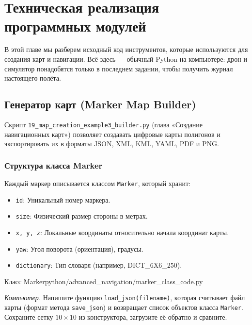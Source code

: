 \section{Техническая реализация программных модулей}
\label{sec:python-tools}

В этой главе мы разберем исходный код инструментов, которые используются для создания карт и навигации. Всё здесь --- обычный Python на компьютере: дрон и симулятор понадобятся только в последнем задании, чтобы получить журнал настоящего полёта.

\subsection{Генератор карт (Marker Map Builder)}
Скрипт \texttt{19\_map\_creation\_example3\_builder.py} (глава «Создание навигационных карт») позволяет создавать цифровые карты полигонов и экспортировать их в форматы JSON, XML, KML, YAML, PDF и PNG.

\subsubsection{Структура класса Marker}
Каждый маркер описывается классом \texttt{Marker}, который хранит:
\begin{itemize}
    \item \texttt{id}: Уникальный номер маркера.
    \item \texttt{size}: Физический размер стороны в метрах.
    \item \texttt{x, y, z}: Локальные координаты относительно начала координат карты.
    \item \texttt{yaw}: Угол поворота (ориентация), градусы.
    \item \texttt{dictionary}: Тип словаря (например, DICT\_6X6\_250).
\end{itemize}

\begin{codefiletitle}[python]{Класс Marker}{python/advanced_navigation/marker_class_code.py}
\end{codefiletitle}

\begin{taskbox}
\emph{Компьютер.} Напишите функцию \texttt{load\_json(filename)}, которая считывает файл карты (формат метода \verb|save_json|) и возвращает список объектов класса \texttt{Marker}. Сохраните сетку $10 \times 10$ из конструктора, загрузите её обратно и сравните.
\end{taskbox}

